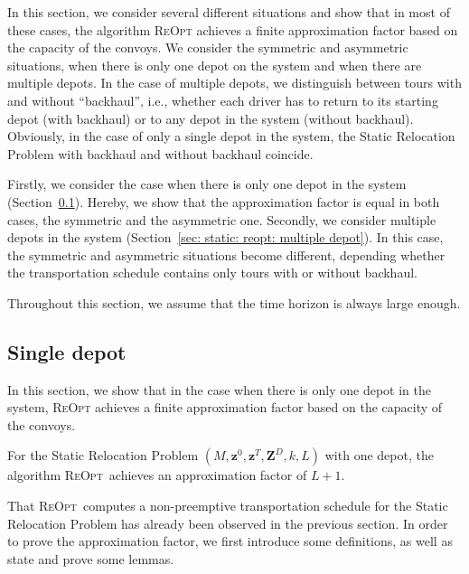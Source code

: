 \documentclass[english]{llncs}
\numberwithin{sublemma}{lemma}
\newcommand{\capd}{\ensuremath{L}}
\newcommand{\z}{\boldsymbol{z}}
\newcommand{\zd}{\boldsymbol{Z}^D} \newcommand{\zzd}{Z^D}
\newcommand{\REOPT}{\textsc{ReOpt}\xspace}
\begin{document}
In this section, we consider several different situations and show that in most of these cases, the algorithm \REOPT achieves a finite approximation factor based on the capacity of the convoys.
We consider the symmetric and asymmetric situations, when there is only one depot on the system and when there are multiple depots.
In the case of multiple depots, we distinguish between tours with and without ``backhaul'', i.e., whether each driver has to return to its starting depot (with backhaul) or to any depot in the system (without backhaul).
Obviously, in the case of only a single depot in the system, the Static Relocation Problem with backhaul and without backhaul coincide.


Firstly, we consider the case when there is only one depot in the system (Section~\ref{sec: static: reopt: single depot}).
Hereby, we show that the approximation factor is equal in both cases, the symmetric and the asymmetric one.
Secondly, we consider multiple depots in the system (Section~\ref{sec: static: reopt: multiple depot}).
In this case, the symmetric and asymmetric situations become different, depending whether the transportation schedule contains only tours with or without backhaul.


Throughout this section, we assume that the time horizon is always large enough.



\subsection{Single depot}
\label{sec: static: reopt: single depot}

In this section, we show that in the case when there is only one depot in the system, \REOPT achieves a finite approximation factor based on the capacity of the convoys.



\begin{theorem}\label{thm: static: reopt: approximation factor}
For the Static Relocation Problem $(M, \z^0, \z^T, \zd, k, \capd)$ with one depot,
the algorithm \REOPT\ achieves an approximation factor of $\capd + 1$. \end{theorem}


That \REOPT\ computes a non-preemptive transportation schedule for the Static Relocation Problem has already been observed in the previous section.
In order to prove the approximation factor, we first introduce some definitions, as well as state and prove some lemmas.
\end{document}
